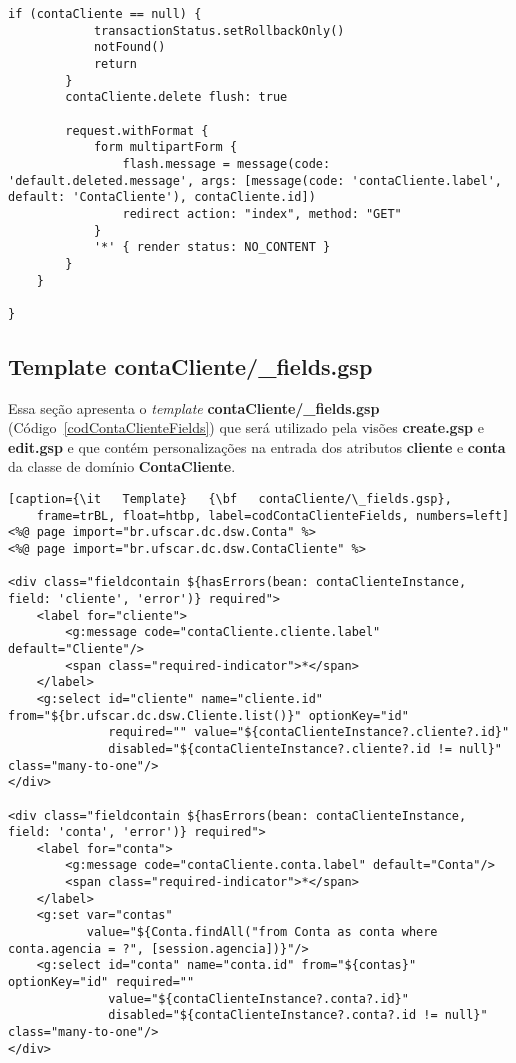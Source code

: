\begin{lstlisting}[caption=Controlador {\bf ContaClienteController}, frame=trBL,
    float=htbp, label=codContaClienteController2]
        if (contaCliente == null) {
            transactionStatus.setRollbackOnly()
            notFound()
            return
        }
        contaCliente.delete flush: true

        request.withFormat {
            form multipartForm {
                flash.message = message(code: 'default.deleted.message', args: [message(code: 'contaCliente.label', default: 'ContaCliente'), contaCliente.id])
                redirect action: "index", method: "GET"
            }
            '*' { render status: NO_CONTENT }
        }
    }

}
\end{lstlisting}

\newpage

\subsection{Template contaCliente/\_fields.gsp}

\vspace{0.5cm}

Essa   seção  apresenta   o  {\it   template}   {\bf  contaCliente/\_fields.gsp}
(Código~\ref{codContaClienteFields})  que   será  utilizado  pela   visões  {\bf
  create.gsp}  e {\bf  edit.gsp} e  que  contém personalizações  na entrada  dos
atributos {\bf cliente} e {\bf conta} da classe de domínio {\bf ContaCliente}.  

\begin{lstlisting}[caption={\it   Template}   {\bf   contaCliente/\_fields.gsp},
    frame=trBL, float=htbp, label=codContaClienteFields, numbers=left] 
<%@ page import="br.ufscar.dc.dsw.Conta" %>
<%@ page import="br.ufscar.dc.dsw.ContaCliente" %>

<div class="fieldcontain ${hasErrors(bean: contaClienteInstance, field: 'cliente', 'error')} required">
    <label for="cliente">
        <g:message code="contaCliente.cliente.label" default="Cliente"/>
        <span class="required-indicator">*</span>
    </label>
    <g:select id="cliente" name="cliente.id" from="${br.ufscar.dc.dsw.Cliente.list()}" optionKey="id"
              required="" value="${contaClienteInstance?.cliente?.id}"
              disabled="${contaClienteInstance?.cliente?.id != null}" class="many-to-one"/>
</div>

<div class="fieldcontain ${hasErrors(bean: contaClienteInstance, field: 'conta', 'error')} required">
    <label for="conta">
        <g:message code="contaCliente.conta.label" default="Conta"/>
        <span class="required-indicator">*</span>
    </label>
    <g:set var="contas"
           value="${Conta.findAll("from Conta as conta where conta.agencia = ?", [session.agencia])}"/>
    <g:select id="conta" name="conta.id" from="${contas}" optionKey="id" required=""
              value="${contaClienteInstance?.conta?.id}"
              disabled="${contaClienteInstance?.conta?.id != null}" class="many-to-one"/>
</div>
\end{lstlisting}

